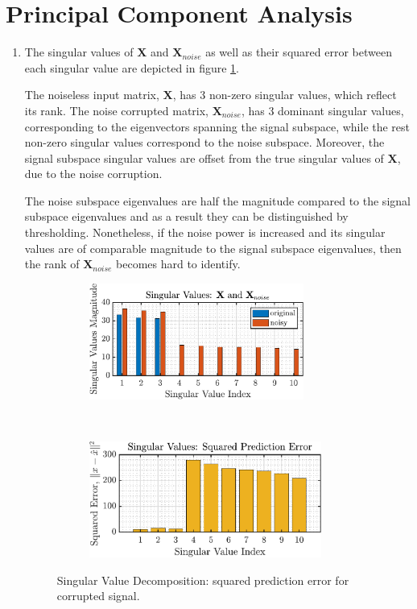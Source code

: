 \section{Principal Component Analysis}

\begin{enumerate}[label=\alph*), leftmargin=*]
\item
%

The singular values of $\mathbf{X}$ and $\mathbf{X}_{noise}$ as well as their squared error between each singular value
are depicted in figure \ref{fig:2_3_a}.

The noiseless input matrix, $\mathbf{X}$, has 3 non-zero singular values, which reflect its rank.
The noise corrupted matrix, $\mathbf{X}_{noise}$, has 3 dominant singular values, corresponding to the eigenvectors spanning
the signal subspace, while the rest non-zero singular values correspond to the noise subspace. Moreover, the signal subspace
singular values are offset from the true singular values of $\mathbf{X}$, due to the noise corruption.

The noise subspace eigenvalues are half the magnitude compared to the signal subspace eigenvalues and as a result they
can be distinguished by thresholding. Nonetheless, if the noise power is increased and its singular values are of comparable
magnitude to the signal subspace eigenvalues, then the rank of $\mathbf{X}_{noise}$ becomes hard to identify.

\begin{figure}[h]
    \centering
    \begin{subfigure}{0.49\textwidth}
        \centering
        \includegraphics[height=1.5in]{report/parametric-and-line-spectra/principal-component-analysis/assets/a/svd}
    \end{subfigure}
    ~
    \begin{subfigure}{0.49\textwidth}
        \centering
        \includegraphics[height=1.5in]{report/parametric-and-line-spectra/principal-component-analysis/assets/a/error}
    \end{subfigure}
    \caption{Singular Value Decomposition: squared prediction error for corrupted signal.}
    \label{fig:2_3_a}
\end{figure}




\end{enumerate}
